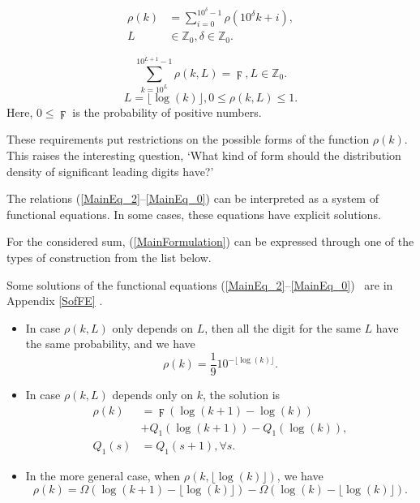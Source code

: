 \documentclass[titlepage,fleqn]{article}%
\providecommand{\U}[1]{\protect\rule{.1in}{.1in}}
\begin{document}
\begin{align}
\rho(k)  &  =%
{\displaystyle\sum\limits_{i=0}^{10^{\delta}-1}}
\rho(10^{\delta}k+i),\label{MainEq_2}\\
L  &  \in%
\mathbb{Z}
_{0},\delta\in%
\mathbb{Z}
_{0}.\nonumber
\end{align}
%

\begin{equation}%
{\displaystyle\sum\limits_{k=10^{L}}^{10^{L+1}-1}}
\rho(k,L)=\digamma,L\in%
\mathbb{Z}
_{0}. \label{MainEq_0}%
\end{equation}%
\[
L=\lfloor\log(k)\rfloor,0\leq\rho(k,L)\leq1.
\]
\noindent Here, $0\leq\digamma$ is the probability of positive numbers.

These requirements put restrictions on the possible forms of the function
$\rho(k)$. This raises the interesting question, `What kind of form should the
distribution density of significant leading digits have?'

The relations (\ref{MainEq_2}--\ref{MainEq_0}) can be interpreted as a system
of functional equations. In some cases, these equations have explicit solutions.

For the considered sum, (\ref{MainFormulation}) can be expressed through one
of the types of construction from the list below.

Some solutions of the functional equations (\ref{MainEq_2}--\ref{MainEq_0})
\ are in Appendix
\ref{SofFE}%
.

\begin{itemize}
\item In case $\rho(k,L)$ only depends on $L$, then all the digit for the same
$L$ have the same probability, and we have%
\begin{equation}
\rho(k)=\frac{1}{9}10^{-\lfloor\log(k)\rfloor}. \label{S1}%
\end{equation}


\item In case $\rho(k,L)$ depends only on $k$, the solution is%
\begin{align}
\rho(k)  &  =\digamma\left(  \log(k+1)-\log(k)\right) \label{S2}\\
&  +Q_{1}(\log(k+1))-Q_{1}(\log(k)),\nonumber\\
Q_{1}(s)  &  =Q_{1}(s+1),\forall s.\nonumber
\end{align}


\item In the more general case, when $\rho(k,\lfloor\log(k)\rfloor)$, we have%
\begin{equation}
\rho(k)=\Omega(\log(k+1)-\lfloor\log(k)\rfloor)-\Omega(\log(k)-\lfloor
\log(k)\rfloor). \label{S3}%
\end{equation}

\end{itemize}
\end{document}
